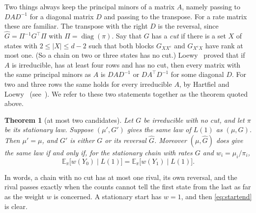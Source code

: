 \documentclass[11pt]{article}
\newtheorem{theorem}{Theorem}[section]
\theoremstyle{definition}
\theoremstyle{remark}
\newcommand{\E}{\mathbb E}
\begin{document}
Two things always keep the principal minors of a matrix $A$, namely passing to
$DAD^{-1}$ for a diagonal matrix $D$ and passing to the transpose. For a rate
matrix these are familiar. The transpose with the right $D$ is the reversal,
since $\hat G=\Pi^{-1}G^{\top}\Pi$ with $\Pi=\operatorname{diag}(\pi)$. Say that
$G$ has a \emph{cut} if there is a set $X$ of states with $2\le|X|\le d-2$ such
that both blocks $G_{XX^c}$ and $G_{X^cX}$ have rank at most one. (So a chain
on two or three states has no cut.) Loewy~\cite{loewy1986} proved that if $A$
is irreducible, has at least four rows and has no cut, then every matrix with
the same principal minors as $A$ is $DAD^{-1}$ or $DA^{\top}D^{-1}$ for some
diagonal $D$. For two and three rows the same holds for every irreducible $A$,
by Hartfiel and Loewy~\cite{hl1984} (see~\cite[Lemma~2.8]{cggr2025}). We refer
to these two statements together as the theorem quoted above.

\begin{theorem}[at most two candidates]\label{thm:rigid}
Let $G$ be irreducible with no cut, and let $\pi$ be its stationary law. Suppose
$(\mu',G')$ gives the same law of $L(1)$ as $(\mu,G)$. Then $\mu'=\mu$, and
$G'$ is either $G$ or its reversal $\hat G$. Moreover $(\mu,\hat G)$ does give
the same law if and only if, for the stationary chain with rates $G$ and
$w_i=\mu_i/\pi_i$,
\begin{equation}\label{eq:startend}
\E_\pi\bigl[w(Y_0)\mid L(1)\bigr]=\E_\pi\bigl[w(Y_1)\mid L(1)\bigr].
\end{equation}
\end{theorem}

In words, a chain with no cut has at most one rival, its own reversal, and the
rival passes exactly when the counts cannot tell the first state from the last
as far as the weight $w$ is concerned. A stationary start has $w=1$, and then
\eqref{eq:startend} is clear.
\end{document}
